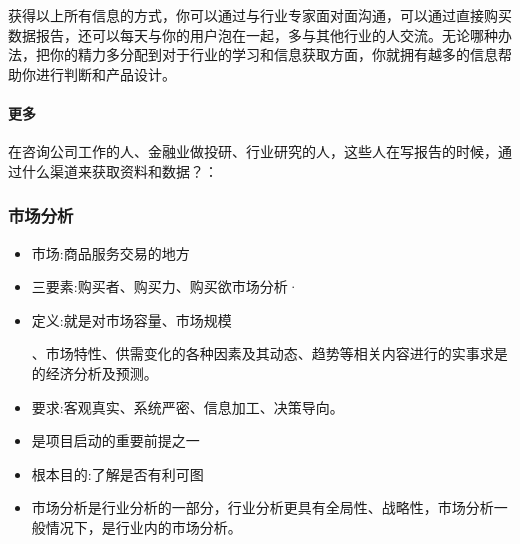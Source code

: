 \documentclass[letterpaper,11pt,english]{sphinxmanual}
\begin{document}
获得以上所有信息的方式，你可以通过与行业专家面对面沟通，可以通过直接购买数据报告，还可以每天与你的用户泡在一起，多与其他行业的人交流。无论哪种办法，把你的精力多分配到对于行业的学习和信息获取方面，你就拥有越多的信息帮助你进行判断和产品设计。


\paragraph{更多}
\label{\detokenize{chapter_knowledge/industry_analysis:id26}}
在咨询公司工作的人、金融业做投研、行业研究的人，这些人在写报告的时候，通过什么渠道来获取资料和数据？：


\subsubsection{市场分析}
\label{\detokenize{chapter_knowledge/market_analysis:market-analysis}}\label{\detokenize{chapter_knowledge/market_analysis:id1}}\label{\detokenize{chapter_knowledge/market_analysis::doc}}\begin{itemize}
\item {} 
市场:商品服务交易的地方

\item {} 
三要素:购买者、购买力、购买欲市场分析·

\item {} 
定义:就是对市场容量、市场规模%
\begin{footnote}[442]\sphinxAtStartFootnote
{}
%
\end{footnote}、市场特性、供需变化的各种因素及其动态、趋势等相关内容进行的实事求是的经济分析及预测。

\item {} 
要求:客观真实、系统严密、信息加工、决策导向。

\item {} 
是项目启动的重要前提之一

\item {} 
根本目的:了解是否有利可图%
\begin{footnote}[443]\sphinxAtStartFootnote
{}
%
\end{footnote}

\item {} 
市场分析是行业分析的一部分，行业分析更具有全局性、战略性，市场分析一般情况下，是行业内的市场分析。

\end{itemize}
\end{document}
